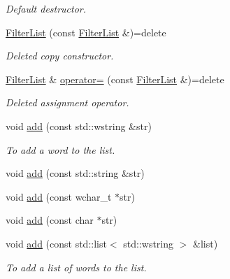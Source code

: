 \begin{DoxyCompactItemize}
\begin{DoxyCompactList}\small\item\em Default destructor. \end{DoxyCompactList}\item 
\mbox{\label{classlakoo_1_1_filter_list_a0544da11a6c0f98bff84a8ec6edfc385}} 
\hyperlink{classlakoo_1_1_filter_list_a0544da11a6c0f98bff84a8ec6edfc385}{Filter\+List} (const \hyperlink{classlakoo_1_1_filter_list}{Filter\+List} \&)=delete
\begin{DoxyCompactList}\small\item\em Deleted copy constructor. \end{DoxyCompactList}\item 
\mbox{\label{classlakoo_1_1_filter_list_adfcc14545ca836f63d7de211fce59ed4}} 
\hyperlink{classlakoo_1_1_filter_list}{Filter\+List} \& \hyperlink{classlakoo_1_1_filter_list_adfcc14545ca836f63d7de211fce59ed4}{operator=} (const \hyperlink{classlakoo_1_1_filter_list}{Filter\+List} \&)=delete
\begin{DoxyCompactList}\small\item\em Deleted assignment operator. \end{DoxyCompactList}\item 
void \hyperlink{classlakoo_1_1_filter_list_a7e2d437ce3f04b8e3bd716c65539d8a5}{add} (const std\+::wstring \&str)
\begin{DoxyCompactList}\small\item\em To add a word to the list. \end{DoxyCompactList}\item 
void \hyperlink{classlakoo_1_1_filter_list_aa5a478b5f4bdd0b887a30033f2de9005}{add} (const std\+::string \&str)
\item 
void \hyperlink{classlakoo_1_1_filter_list_afa7823ad250d1d8b413f6b8e03628ab1}{add} (const wchar\+\_\+t $\ast$str)
\item 
void \hyperlink{classlakoo_1_1_filter_list_a18832d0651232414540a844e603e8f82}{add} (const char $\ast$str)
\item 
void \hyperlink{classlakoo_1_1_filter_list_ac7e57e54deb4c41f5865734671ca5f12}{add} (const std\+::list$<$ std\+::wstring $>$ \&list)
\begin{DoxyCompactList}\small\item\em To add a list of words to the list. \end{DoxyCompactList}\item 

\end{DoxyCompactItemize}
